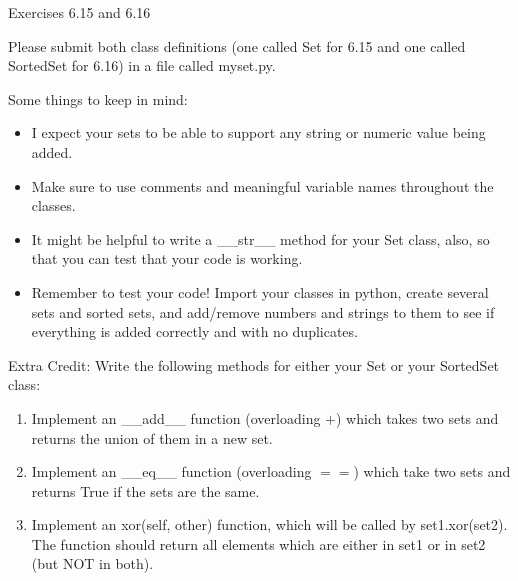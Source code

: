 \documentclass[11pt]{article}
\begin{document}
\begin{problems}
\item Exercises 6.15 and 6.16

Please submit both class definitions (one called Set for 6.15 and one called SortedSet for
6.16) in a file called myset.py.  

Some things to keep in mind:

\begin{itemize}

\item I expect your sets to be able to support any string or numeric value being added.

\item Make sure to use comments and meaningful variable names throughout the classes.

\item It might be helpful to write a \_\_str\_\_ method for your Set class, also, so that you can test that your code is working.

\item Remember to test your code!  Import your classes in python, create several sets and sorted sets, and add/remove numbers and strings to them to see if everything is added correctly and with no duplicates.  

\end{itemize}

\item Extra Credit: Write the following methods for either your Set or your SortedSet class:

\begin{enumerate}
\item Implement an \_\_add\_\_ function (overloading $+$) which takes two sets and returns
the union of them in a new set.

\item Implement an \_\_eq\_\_ function (overloading $==$) which take two sets and returns
True if the sets are the same.

\item Implement an xor(self, other) function, which will be called by
set1.xor(set2).  The function should return  all elements which are
either in set1 or in set2 (but NOT in both).
\end{enumerate}

\end{problems}
\end{document}
